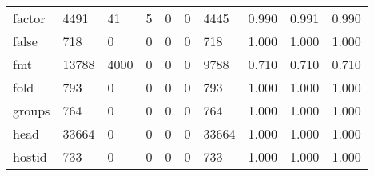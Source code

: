 \begin{longtable}{lp{1.3cm}p{1.3cm}p{1.3cm}p{1.3cm}p{1.3cm}p{1.3cm}p{1.3cm}p{1.3cm}p{1.3cm}}
factor    &                   4491 &                                 41 &                                 5 &                                0 &                                 0 &                            4445 &                                0.990 &                                  0.991 &                                0.990 \\
false     &                    718 &                                  0 &                                 0 &                                0 &                                 0 &                             718 &                                1.000 &                                  1.000 &                                1.000 \\
fmt       &                  13788 &                               4000 &                                 0 &                                0 &                                 0 &                            9788 &                                0.710 &                                  0.710 &                                0.710 \\
fold      &                    793 &                                  0 &                                 0 &                                0 &                                 0 &                             793 &                                1.000 &                                  1.000 &                                1.000 \\
groups    &                    764 &                                  0 &                                 0 &                                0 &                                 0 &                             764 &                                1.000 &                                  1.000 &                                1.000 \\
head      &                  33664 &                                  0 &                                 0 &                                0 &                                 0 &                           33664 &                                1.000 &                                  1.000 &                                1.000 \\
hostid    &                    733 &                                  0 &                                 0 &                                0 &                                 0 &                             733 &                                1.000 &                                  1.000 &                                1.000 \\

\end{longtable}
